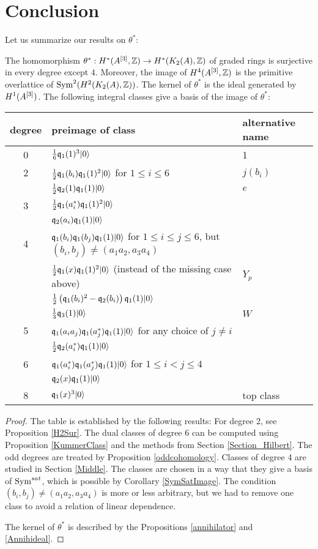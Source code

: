 \section{Conclusion}
Let us summarize our results on $\theta^*$:
\begin{theorem}\label{thetaTheorem}
The homomorphism $\theta^* : H^*(A\hilb{3},\Z)\rightarrow H^*(\kum{A}{2},\Z)$ of graded rings is surjective in every degree except $4$. Moreover, the image of $H^4(A\hilb{3},\Z)$ is the primitive overlattice of $\Sym^2(H^2(\kum{A}{2},\Z))$. 
The kernel of $\theta^*$ is the ideal generated by $H^1(A\hilb{3})$.
The following integral classes give a basis of the image of $\theta^*$:
\begin{center}
\begin{tabular}{c|l|l}
degree & preimage of class & alternative name  \\
\hline
0 & $\frac{1}{6} \q_1(1)^3\vac$ & 1 \\
\hline
2 &  $\frac{1}{2}\q_1(b_i) \q_1(1)^2\vac$ for $1\leq i\leq 6$ & $j(b_i)$ \\
 & $\frac{1}{2} \q_2(1)\q_1(1)\vac $  & $e$\\
\hline
3 & $\frac{1}{2}\q_1(a^*_i)\q_1(1)^2\vac$ & \\
  & $\q_2(a_i)\q_1(1)\vac$ & \\
\hline
4 & $\q_1(b_i)\q_1(b_j)\q_1(1)\vac$ for $1\leq i\leq j\leq 6$, but $(b_i,b_j)\neq(a_1a_2,a_3a_4)$ &\\
  & $\frac{1}{2}\q_1(x)\q_1(1)^2\vac$ (instead of the missing case above)  & $Y_p$\\
  & $\frac{1}{2}\left(\q_1(b_i)^2-\q_2(b_i)\right)\q_1(1)\vac$ & \\
  & $\frac{1}{3} \q_3(1)\vac$ & $W$ \\
\hline
5 & $\q_1(a_ia_j)\q_1(a_j^*)\q_1(1) \vac$ for any choice of $j\neq i$ &\\
  & $\frac{1}{2} \q_2(a^*_i)\q_1(1)\vac $ &\\
\hline
6 & $\q_1(a_i^*)\q_1(a_j^*)\q_1(1)\vac$ for $1\leq i< j\leq 4$ & \\
  & $\q_2(x)\q_1(1)\vac$ & \\
\hline
8 & $\q_1(x)^3\vac$ & top class
\end{tabular}
\end{center}
\end{theorem}
\begin{proof}
The table is established by the following results:
For degree 2, see Proposition \ref{H2Sur}. The dual classes of degree 6 can be computed using Proposition \ref{KummerClass} and the methods from Section \ref{Section_Hilbert}.
The odd degrees are treated by Proposition \ref{oddcohomology}. Classes of degree 4 are studied in Section \ref{Middle}. The classes are chosen in a way that they give a basis of $\Sym^{sat}$, which is possible by Corollary \ref{SymSatImage}. The condition $(b_i,b_j)\neq(a_1a_2,a_3a_4)$ is more or less arbitrary, but we had to remove one class to avoid a relation of linear dependence.

The kernel of $\theta^*$ is described by the Propositions \ref{annihilator} and \ref{Annihideal}.
\end{proof}



